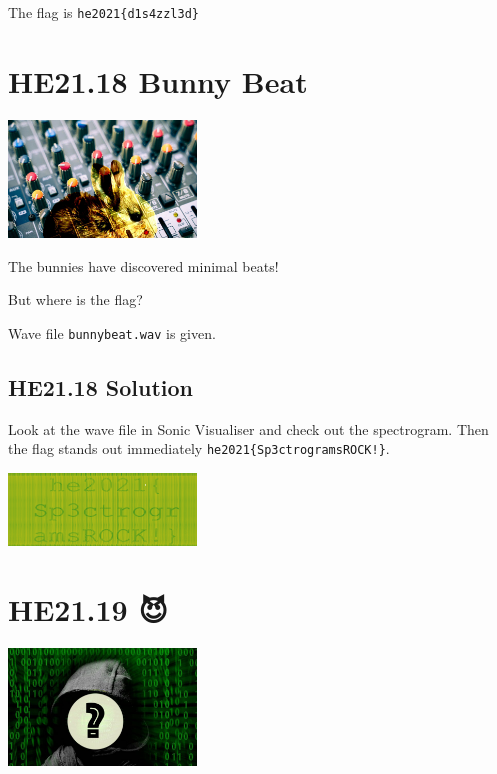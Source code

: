 \documentclass[english,a4paper,nols,noindent]{tufte-handout}
\begin{document}
The flag is \verb+he2021{d1s4zzl3d}+

\hypertarget{he21.18}{%
  \section{HE21.18 Bunny Beat}
  \label{he21.18}}
\begin{marginfigure}
    \includegraphics[width=50mm]{images/challenge18.jpg}
\end{marginfigure}

\noindent The bunnies have discovered minimal beats!

But where is the flag?

Wave file \verb+bunnybeat.wav+ is given.

\hypertarget{he21.18-solution}{%
\subsection{HE21.18 Solution}\label{he21.18-solution}}

\noindent Look at the wave file in Sonic Visualiser and check out the
spectrogram.  Then the flag stands out immediately
\verb+he2021{Sp3ctrogramsROCK!}+.

\begin{marginfigure}
    \includegraphics[width=50mm]{ch18/spectrogram.png}
\end{marginfigure}


\hypertarget{he21.19}{%
  \section{HE21.19 😈}
  \label{he21.19}}
\begin{marginfigure}
    \includegraphics[width=50mm]{images/challenge19.jpg}
\end{marginfigure}
\end{document}
